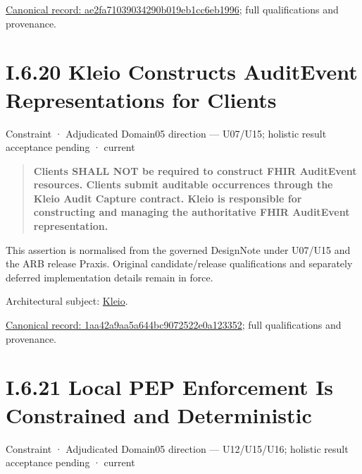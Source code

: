 {\footnotesize \href{../../../../continuum/motivation/constraint/ae2fa71039034290b019eb1cc6eb1996.md}{Canonical record: ae2fa71039034290b019eb1cc6eb1996}; full qualifications and provenance.}\par
\section*{I.6.20 Kleio Constructs AuditEvent Representations for Clients}
\label{navigation:I.6.20}

\label{element:1aa42a9aa5a644bc9072522e0a123352}
{\small Constraint · Adjudicated Domain05 direction — U07/U15; holistic result acceptance pending · current}\par

\begin{quote}


\textbf{Clients SHALL NOT be required to construct FHIR AuditEvent resources. Clients submit auditable occurrences through the Kleio Audit Capture contract. Kleio is responsible for constructing and managing the authoritative FHIR AuditEvent representation.}



\end{quote}


This assertion is normalised from the governed DesignNote under U07/U15 and the ARB release Praxis. Original candidate/release qualifications and separately deferred implementation details remain in force.



Architectural subject: \hyperref[element:fefda110e2274884ad58906733606efd]{Kleio}.


{\footnotesize \href{../../../../continuum/motivation/constraint/1aa42a9aa5a644bc9072522e0a123352.md}{Canonical record: 1aa42a9aa5a644bc9072522e0a123352}; full qualifications and provenance.}\par
\section*{I.6.21 Local PEP Enforcement Is Constrained and Deterministic}
\label{navigation:I.6.21}

\label{element:8c9ef077cb5d4cc9aacb55d743b1af92}
{\small Constraint · Adjudicated Domain05 direction — U12/U15/U16; holistic result acceptance pending · current}\par

